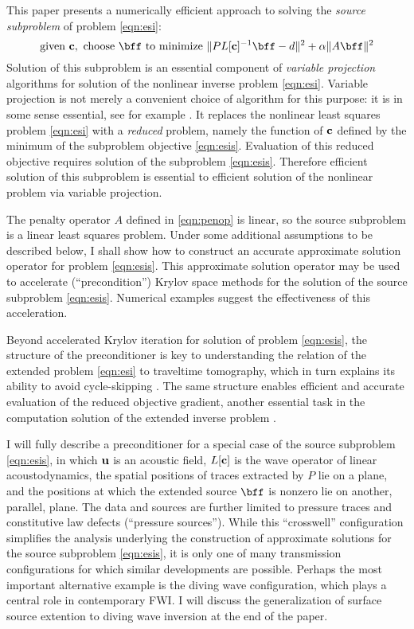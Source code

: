 This paper presents a numerically efficient approach to solving the
{\em source subproblem} of problem \ref{eqn:esi}:
\begin{equation}
\label{eqn:esis}
\mbox{given } {\bf c}, \mbox{ choose } \bff \mbox{ to minimize }
\|PL[{\bf c}]^{-1}\bff -d \|^2 + \alpha \|A\bff\|^2 
\end{equation}
Solution of this subproblem is an essential component of {\em variable
  projection} algorithms for solution of the nonlinear inverse problem
\ref{eqn:esi}. Variable projection is not merely a convenient choice
of algorithm for this purpose: it is in some sense essential, see for
example \cite{Symes:SEG20}. It replaces the nonlinear
least squares problem \ref{eqn:esi} with a {\em reduced} problem, namely the function of ${\bf c}$ defined by the minimum of the subproblem objective \ref{eqn:esis}. Evaluation of this reduced objective requires solution of the
subproblem \ref{eqn:esis}. Therefore efficient solution of this
subproblem is essential to efficient solution of the nonlinear problem
via variable projection.

The penalty operator $A$ defined in \ref{eqn:penop} is linear, so the source
subproblem is a linear least squares problem. Under some additional
assumptions to be described below, I shall show how to construct an
accurate approximate solution operator for problem
\ref{eqn:esis}. This approximate solution operator may be used to
accelerate (``precondition'') Krylov space methods for the solution of the source
subproblem \ref{eqn:esis}. Numerical examples suggest the
effectiveness of this acceleration.

Beyond accelerated Krylov iteration for solution of problem \ref{eqn:esis}, the structure of the preconditioner is key to understanding the relation of the extended problem \ref{eqn:esi} to traveltime tomography, which in turn explains its ability to avoid cycle-skipping \cite[]{Symes:22b}. The same structure enables efficient and accurate evaluation of the reduced objective gradient, another essential task in the computation solution of the extended inverse problem \cite[]{Symes:22c}.

I will fully describe a preconditioner for a special
case of the source subproblem \ref{eqn:esis}, in which ${\bf u}$ is an
acoustic field, $L[{\bf c}]$ is the wave operator of linear
acoustodynamics, the spatial positions of traces extracted by $P$ lie
on a plane, and the positions at which the extended
source $\bff$ is nonzero lie on another, parallel, plane. The data and
sources are further limited to pressure traces and constitutive law
defects (``pressure sources''). While this
``crosswell'' configuration simplifies the analysis underlying the
construction of approximate solutions for the source subproblem
\ref{eqn:esis}, it is only one of many transmission configurations for
which similar developments are possible. Perhaps the most important
alternative example is the diving wave configuration, which plays a
central role in contemporary FWI. I will discuss the generalization of
surface source extention to diving wave inversion at the end of the
paper.

